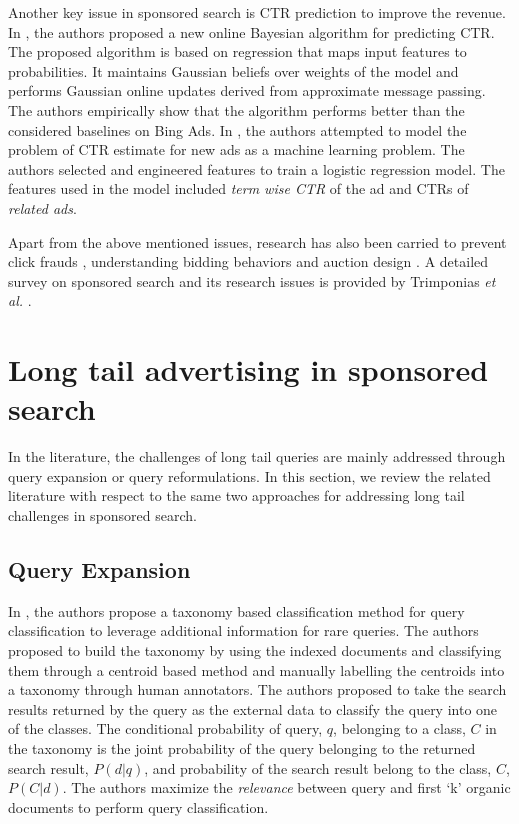 Another key issue in sponsored search is CTR prediction to improve the revenue. In \cite{graepel2010web}, the authors proposed a new online Bayesian algorithm for predicting CTR. The proposed algorithm is based on regression that maps input features to probabilities. It maintains Gaussian beliefs over weights of the model and performs Gaussian online updates derived from approximate message passing. The authors empirically show that the algorithm performs better than the considered baselines on Bing Ads. In \cite{CTREstimateNewAds}, the authors attempted to model the problem of CTR estimate for new ads as a machine learning problem. The authors selected and engineered features to train a logistic regression model. The features used in the model included \textit{term wise CTR} of the ad and CTRs of \textit{related ads}. 

Apart from the above mentioned issues, research has also been carried to prevent click frauds \cite{li2014search}, understanding bidding behaviors \cite{katona2010race} and auction design \cite{jansen2011bidding}. 
A detailed survey on sponsored search and its research issues is provided by Trimponias \textit{et al.} \cite{survey_ss}.


\section{Long tail advertising in sponsored search}
In the literature, the challenges of long tail queries are mainly addressed through query expansion or query reformulations. In this section, we review the related literature with respect to the same two approaches for addressing long tail challenges in sponsored search.

\subsection{Query Expansion}

In \cite{broder2007robust}, the authors propose a taxonomy based classification method for query classification to leverage additional information for rare queries. The authors proposed to build the taxonomy by using the indexed documents and classifying them through a centroid based method and manually labelling the centroids into a taxonomy through human annotators. The authors proposed to take the search results returned by the query as the external data to classify the query into one of the classes. The conditional probability of query, $q$, belonging to a class, $C$ in the taxonomy is the joint probability of the query belonging to the returned search result, $P(d|q)$, and probability of the search result belong to the class, $C$, $P(C|d)$.  The authors maximize the \textit{relevance} between query and first `k' organic documents to perform query classification. 


